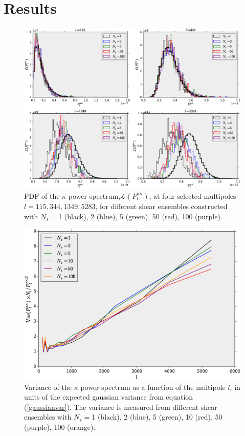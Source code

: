 \documentclass[reprint,aps,prd,superscriptaddress,showkeys,showpacs]{revtex4-1}
\begin{document}

\section{Results}

\begin{figure}
\includegraphics[scale=0.4]{Figures/ps_pdf.eps}
\caption{PDF of the $\kappa$ power spectrum,$\mathcal{L}(P_l^{\kappa\kappa})$, at four selected multipoles $l=115,344,1349,5283$, for different shear ensembles constructed with $N_s=$1 (black), 2 (blue), 5 (green), 50 (red), 100 (purple).}
\label{ps_pdf}
\end{figure}

\begin{figure}
\includegraphics[scale=0.3]{Figures/ps_variance.eps}
\caption{Variance of the $\kappa$ power spectrum as a function of the multipole $l$, in units of the expected gaussian variance from equation (\ref{gaussianvar}). The variance is measured from different shear ensembles with $N_s=$1 (black), 2 (blue), 5 (green), 10 (red), 50 (purple), 100 (orange). }
\label{ps_var}
\end{figure}
\end{document}
